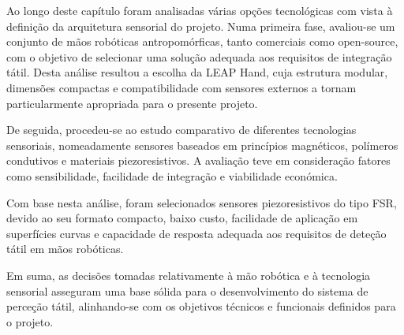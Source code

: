 Ao longo deste capítulo foram analisadas várias opções tecnológicas com vista à definição da arquitetura sensorial do projeto. Numa primeira fase, avaliou-se um conjunto de mãos robóticas antropomórficas, tanto comerciais como open-source, com o objetivo de selecionar uma solução adequada aos requisitos de integração tátil. Desta análise resultou a escolha da LEAP Hand\cite{shaw2023leaphand}, cuja estrutura modular, dimensões compactas e compatibilidade com sensores externos a tornam particularmente apropriada para o presente projeto.

De seguida, procedeu-se ao estudo comparativo de diferentes tecnologias sensoriais, nomeadamente sensores baseados em princípios magnéticos, polímeros condutivos e materiais piezoresistivos. A avaliação teve em consideração fatores como sensibilidade, facilidade de integração e viabilidade económica.

Com base nesta análise, foram selecionados sensores piezoresistivos do tipo \ac{FSR}, devido ao seu formato compacto, baixo custo, facilidade de aplicação em superfícies curvas e capacidade de resposta adequada aos requisitos de deteção tátil em mãos robóticas.

Em suma, as decisões tomadas relativamente à mão robótica e à tecnologia sensorial asseguram uma base sólida para o desenvolvimento do sistema de perceção tátil, alinhando-se com os objetivos técnicos e funcionais definidos para o projeto.

